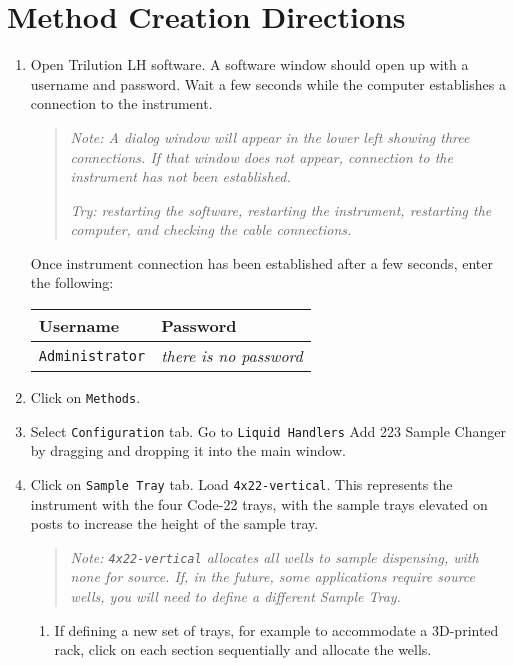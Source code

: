 \documentclass[11pt, oneside]{article}   	%
\begin{document}
\section{Method Creation Directions}
\begin{enumerate}
\item Open Trilution LH software. A software window should open up with a username and password. Wait a few seconds while the computer establishes a connection to the instrument.

\begin{quote}
	\emph{Note: A dialog window will appear in the lower left showing three connections. If that window does not appear, connection to the instrument has not been established.}
	
	\emph{Try: restarting the software, restarting the instrument, restarting the computer, and checking the cable connections.}
\end{quote}

Once instrument connection has been established after a few seconds, enter the following:
\begin{center}
\begin{tabular}{l l}
	\hline
	Username & Password \\
	\hline
	\hline
	\texttt{Administrator} & \emph{there is no password} \\
	\hline
\end{tabular}
\end{center}

\item Click on \texttt{Methods}.
\item Select \texttt{Configuration} tab. Go to  \texttt{Liquid Handlers} Add 223 Sample Changer by dragging and dropping it into the main window.
\item Click on \texttt{Sample Tray} tab. Load \texttt{4x22-vertical}. This represents the instrument with the four Code-22 trays, with the sample trays elevated on posts to increase the height of the sample tray.

\begin{quote}
	\emph{Note: \texttt{4x22-vertical} allocates all wells to sample dispensing, with none for source. If, in the future, some applications require source wells, you will need to define a different Sample Tray.}
\end{quote}


\begin{enumerate}
	\item If defining a new set of trays, for example to accommodate a 3D-printed rack, click on each section sequentially and allocate the wells.
\end{enumerate}


\end{enumerate}
\end{document}
